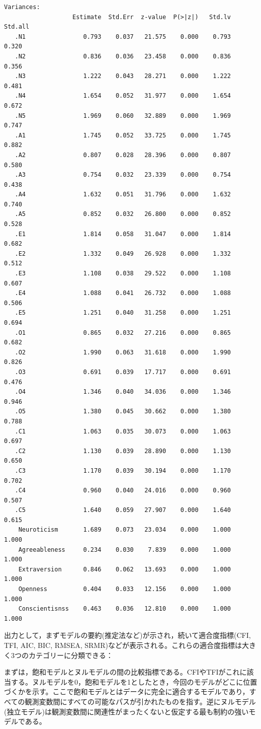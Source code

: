 \documentclass[
  a4paper,
]{ltjsbook}
\begin{document}
\begin{verbatim}
Variances:
                   Estimate  Std.Err  z-value  P(>|z|)   Std.lv  Std.all
   .N1                0.793    0.037   21.575    0.000    0.793    0.320
   .N2                0.836    0.036   23.458    0.000    0.836    0.356
   .N3                1.222    0.043   28.271    0.000    1.222    0.481
   .N4                1.654    0.052   31.977    0.000    1.654    0.672
   .N5                1.969    0.060   32.889    0.000    1.969    0.747
   .A1                1.745    0.052   33.725    0.000    1.745    0.882
   .A2                0.807    0.028   28.396    0.000    0.807    0.580
   .A3                0.754    0.032   23.339    0.000    0.754    0.438
   .A4                1.632    0.051   31.796    0.000    1.632    0.740
   .A5                0.852    0.032   26.800    0.000    0.852    0.528
   .E1                1.814    0.058   31.047    0.000    1.814    0.682
   .E2                1.332    0.049   26.928    0.000    1.332    0.512
   .E3                1.108    0.038   29.522    0.000    1.108    0.607
   .E4                1.088    0.041   26.732    0.000    1.088    0.506
   .E5                1.251    0.040   31.258    0.000    1.251    0.694
   .O1                0.865    0.032   27.216    0.000    0.865    0.682
   .O2                1.990    0.063   31.618    0.000    1.990    0.826
   .O3                0.691    0.039   17.717    0.000    0.691    0.476
   .O4                1.346    0.040   34.036    0.000    1.346    0.946
   .O5                1.380    0.045   30.662    0.000    1.380    0.788
   .C1                1.063    0.035   30.073    0.000    1.063    0.697
   .C2                1.130    0.039   28.890    0.000    1.130    0.650
   .C3                1.170    0.039   30.194    0.000    1.170    0.702
   .C4                0.960    0.040   24.016    0.000    0.960    0.507
   .C5                1.640    0.059   27.907    0.000    1.640    0.615
    Neuroticism       1.689    0.073   23.034    0.000    1.000    1.000
    Agreeableness     0.234    0.030    7.839    0.000    1.000    1.000
    Extraversion      0.846    0.062   13.693    0.000    1.000    1.000
    Openness          0.404    0.033   12.156    0.000    1.000    1.000
    Conscientisnss    0.463    0.036   12.810    0.000    1.000    1.000
\end{verbatim}

出力として，まずモデルの要約(推定法など)が示され，続いて適合度指標(CFI,
TFI, AIC, BIC, RMSEA,
SRMR)などが表示される。これらの適合度指標は大きく3つのカテゴリーに分類できる：

まずは，飽和モデルとヌルモデルの間の比較指標である。CFIやTFIがこれに該当する。ヌルモデルを0，飽和モデルを1としたとき，今回のモデルがどこに位置づくかを示す。ここで飽和モデルとはデータに完全に適合するモデルであり，すべての観測変数間にすべての可能なパスが引かれたものを指す。逆にヌルモデル(独立モデル)は観測変数間に関連性がまったくないと仮定する最も制約の強いモデルである。
\end{document}
